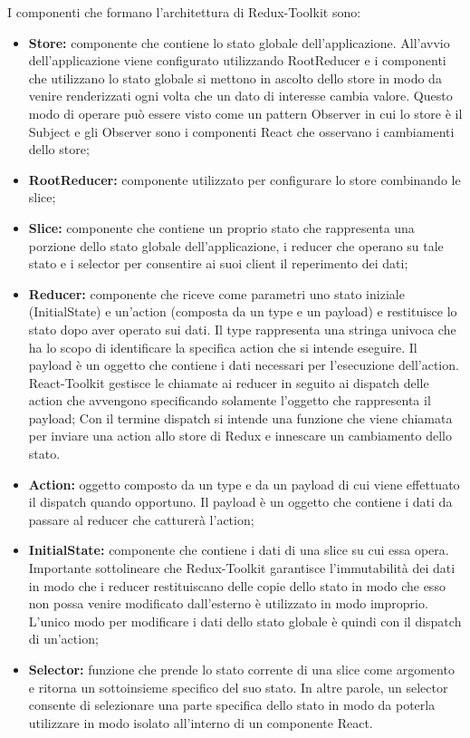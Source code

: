 I componenti che formano l'architettura di Redux-Toolkit sono:
\begin{itemize}
    \item \textbf{Store:} componente che contiene lo stato globale dell'applicazione.
          All'avvio dell'applicazione viene configurato utilizzando RootReducer e i componenti che utilizzano
          lo stato globale si mettono in ascolto dello store in modo da venire renderizzati ogni volta che un dato
          di interesse cambia valore. Questo modo di operare può essere visto come un pattern Observer in
          cui lo store è il Subject e gli Observer sono i componenti React che osservano i cambiamenti dello store;
    \item \textbf{RootReducer:} componente utilizzato per configurare lo store combinando le slice;
    \item \textbf{Slice:} componente che contiene un proprio stato che rappresenta una porzione dello stato globale
          dell'applicazione, i reducer che operano su tale stato e i selector per consentire ai suoi client il
          reperimento dei dati;
    \item \textbf{Reducer:} componente che riceve come parametri uno stato iniziale (InitialState) e un'action
          (composta da un type e un payload) e restituisce lo stato dopo aver operato sui dati.
          Il type rappresenta una stringa univoca che ha lo scopo di identificare la specifica action che si intende eseguire.
          Il payload è un oggetto che contiene i dati necessari per l'esecuzione dell'action.
          React-Toolkit gestisce le chiamate ai reducer in seguito ai dispatch delle action che avvengono
          specificando solamente l'oggetto che rappresenta il payload;
          Con il termine dispatch si intende una funzione che viene chiamata per inviare una action allo store di Redux e innescare un cambiamento dello stato.
    \item \textbf{Action:} oggetto composto da un type e da un payload di cui viene effettuato il dispatch quando
          opportuno. Il payload è un oggetto che contiene i dati da passare al reducer che catturerà l'action;
    \item \textbf{InitialState:} componente che contiene i dati di una slice su cui essa opera.
          Importante sottolineare che Redux-Toolkit garantisce l'immutabilità dei dati in modo che i reducer restituiscano delle copie dello stato in modo che esso non possa venire
          modificato dall'esterno è utilizzato in modo improprio.
          L'unico modo per modificare i dati dello stato globale è quindi con il dispatch di un'action;
    \item \textbf{Selector:} funzione che prende lo stato corrente di una slice come argomento e ritorna un sottoinsieme
          specifico del suo stato. In altre parole, un selector consente di selezionare una parte specifica
          dello stato in modo da poterla utilizzare in modo isolato all'interno di un componente React.
\end{itemize}

